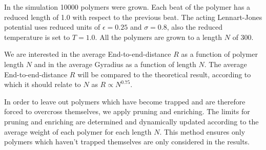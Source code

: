 In the simulation 10000 polymers were grown. Each beat of the polymer has a reduced length of 1.0 with respect to the previous beat. The acting Lennart-Jones potential uses reduced units of $\epsilon=0.25$ and $\sigma=0.8$, also the reduced temperature is set to $T=1.0$. All the polymers are grown to a length $N$ of 300. 

We are interested in the average End-to-end-distance $R$ as a function of polymer length $N$ and in the average Gyradius as a function of length $N$. The average End-to-end-distance $R$ will be compared to the theoretical result, according to which it should relate to $N$ as $R\propto N^{0.75}$.

In order to leave out polymers which have become trapped and are therefore forced to overcross themselves, we apply pruning and enriching. The limits for pruning and enriching are determined and dynamically updated according to the average weight of each polymer for each length $N$. This method ensures only polymers which haven't trapped themselves are only considered in the results.